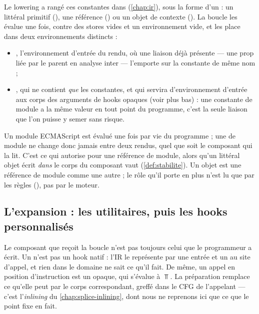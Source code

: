 
Le lowering a rangé ces constantes dans 
(\cref{chap:ir}), sous la forme d'un  : un littéral
primitif (), une référence () ou un objet de contexte
(). La boucle les évalue une fois, contre des stores vides et un
environnement vide, et les place dans deux environnements distincts :
\begin{itemize}
  \item {}, l'environnement d'entrée du rendu, où une liaison
    déjà présente --- une prop liée par le parent en analyse inter --- l'emporte
    sur la constante de même nom ;
  \item {}, qui ne contient \emph{que} les constantes, et qui
    servira d'environnement d'entrée aux corps des arguments de hooks opaques
    (voir plus bas) : une constante de module a la même valeur en tout point
    du programme, c'est la seule liaison que l'on puisse y semer sans risque.
\end{itemize}

\begin{react}
Un module ECMAScript est évalué une fois par vie du programme ; une
 de module ne change donc jamais entre deux rendus, quel que soit
le composant qui la lit. C'est ce qui autorise  pour
une référence de module, alors qu'un littéral objet écrit \emph{dans} le corps
du composant vaut  (\cref{def:stabilite}). Un objet
 est une référence de module comme une autre ; le
rôle  qu'il porte en plus n'est lu que par les règles
(), pas par le moteur.
\end{react}

\subsection{L'expansion : les utilitaires, puis les hooks personnalisés}
\label{sec:point-fixe-composant-expansion}

Le composant que reçoit la boucle n'est pas toujours celui que le programmeur
a écrit. Un  n'est pas un hook natif : l'IR le représente
par une entrée  et un  au site
d'appel, et rien dans le domaine ne sait ce qu'il fait. De même, un appel
 en position d'instruction est un  opaque, qui
s'évalue à $\Top$. La préparation remplace ce qu'elle peut par le corps
correspondant, greffé dans le CFG de l'appelant --- c'est l'\emph{inlining}
du \cref{chap:splice-inlining}, dont nous ne reprenons ici que ce que le point
fixe en fait.


